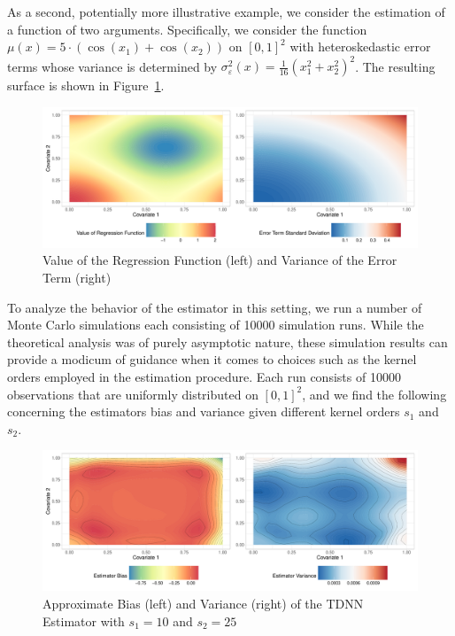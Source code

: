 \newpage
As a second, potentially more illustrative example, we consider the estimation of a function of two arguments.
Specifically, we consider the function $\mu(x) = 5 \cdot \left(\cos(x_1) + \cos(x_2)\right)$ on $[0,1]^2$ with heteroskedastic error terms whose variance is determined by $\sigma_{\varepsilon}^2(x) = \frac{1}{16}\left(x_1^2 + x_2^2\right)^2$.
The resulting surface is shown in Figure~\ref{fig:reg_surface}.

\begin{figure}[H]
	\centering
	\includegraphics[width = \textwidth]{../Graphics/Reg_Exmp1.pdf}
	\caption{Value of the Regression Function (left) and Variance of the Error Term (right)}
	\label{fig:reg_surface}
\end{figure}
To analyze the behavior of the estimator in this setting, we run a number of Monte Carlo simulations each consisting of 10000 simulation runs.
While the theoretical analysis was of purely asymptotic nature, these simulation results can provide a modicum of guidance when it comes to choices such as the kernel orders employed in the estimation procedure.
Each run consists of 10000 observations that are uniformly distributed on ${[0,1]}^2$, and we find the following concerning the estimators bias and variance given different kernel orders $s_1$ and $s_2$.
\begin{figure}[H]
	\centering
	\includegraphics[width = \textwidth]{../Code/Simulations/Graphics/Reg_Exp1/TDNN/Plot_TDNN_n10000s_10_25.RDS.pdf}
	\caption{Approximate Bias (left) and Variance (right) of the TDNN Estimator with $s_1 = 10$ and $s_2 = 25$}
	\label{fig:est_bias_var_2}
\end{figure}
